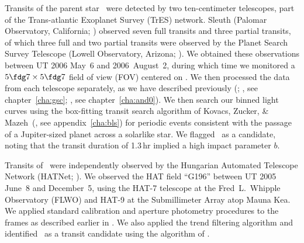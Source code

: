 Transits of the parent star \gscOTO\ were detected by two ten-centimeter telescopes, part of the Trans-atlantic Exoplanet Survey (TrES) network.
Sleuth (Palomar Observatory, California; \citealt{ODonovan_Charbonneau_Kotredes:AIP:2004a}) observed seven full transits and three partial transits, of which three full and two partial transits were observed by the Planet Search Survey Telescope (Lowell Observatory, Arizona; \citealt{Dunham_Mandushev_Taylor:pasp:2004a}).
We obtained these observations between UT 2006 May~6 and 2006~August~2, during which time we monitored a \mbox{$5\fdg7\times5\fdg7$} field of view (FOV) centered on \thetaher.
We then processed the data from each telescope separately, as we have described previously (\citealp{Dunham_Mandushev_Taylor:pasp:2004a}; \citealp{ODonovan_Charbonneau_Torres:apj:2006a}, see chapter~\ref{cha:gsc}; \citealp{ODonovan_Charbonneau_Alonso:apj:2007a}, see chapter~\ref{cha:and0}).
We then search our binned light curves using the box-fitting transit search algorithm of Kovacs, Zucker, \& Mazeh~(\citeyear{Kovacs_Zucker_Mazeh:aa:2002a}, see appendix~\ref{cha:bls}) for periodic events consistent with the passage of a Jupiter-sized planet across a solarlike star.
We flagged \tresThree\ as a candidate, noting that the transit duration of 1.3\,hr implied a high impact parameter $b$.

Transits of \tresThree\ were independently observed by the Hungarian Automated Telescope Network (HATNet; \citealt{Bakos_Noyes_Kovacs:pasp:2004a}).
We observed the HAT field ``G196'' between UT 2005 June~8 and December~5, using the \mbox{HAT-7} telescope at the Fred~L.\ Whipple Observatory (FLWO) and \mbox{HAT-9} at the Submillimeter Array atop Mauna Kea.
We applied standard calibration and aperture photometry procedures to the frames as described earlier in \citet{Bakos_Noyes_Kovacs:apj:2007a}.
We also applied the trend filtering algorithm \citep{Kovacs_Bakos_Noyes:mnras:2005a} and identified \tresThree\ as a transit candidate using the algorithm of \citet{Kovacs_Zucker_Mazeh:aa:2002a}. 

